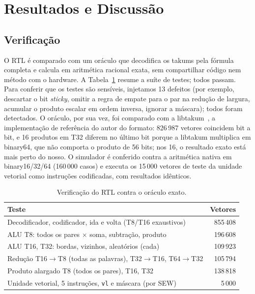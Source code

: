 \documentclass[conference]{IEEEtran}
\newcommand{\code}[1]{\texttt{#1}}
\begin{document}
\section{Resultados e Discussão}

\subsection{Verificação}

O RTL é comparado com um oráculo que decodifica os takums pela fórmula completa e calcula em aritmética
racional exata, sem compartilhar código nem método com o hardware. A Tabela~\ref{tab:verif} resume a suíte
de testes; todos passam. Para conferir que os testes são sensíveis, injetamos 13 defeitos (por exemplo,
descartar o bit \emph{sticky}, omitir a regra de empate para o par na redução de largura, acumular o
produto escalar em ordem inversa, ignorar a máscara); todos foram detectados. O oráculo, por sua vez, foi comparado com a libtakum~\cite{libtakum}, a
implementação de referência do autor do formato: 826\,987 vetores coincidem bit a bit, e 16 produtos em T32
diferem no último bit porque a libtakum multiplica em binary64, que não comporta o produto de 56 bits; nos
16, o resultado exato está mais perto do nosso. O simulador é conferido
contra a aritmética nativa em binary16/32/64 (160\,000 casos) e executa os 15\,000 vetores de teste da
unidade vetorial como instruções codificadas, com resultados idênticos.

\begin{table}[t]
\caption{Verificação do RTL contra o oráculo exato.}
\label{tab:verif}
\centering
\begin{tabular}{@{}lr@{}}
\toprule
Teste & Vetores\\
\midrule
Decodificador, codificador, ida e volta (T8/T16 exaustivos) & 855\,408\\
ALU T8: todos os pares $\times$ soma, subtração, produto & 196\,608\\
ALU T16, T32: bordas, vizinhos, aleatórios (cada) & 109\,923\\
Redução T16$\to$T8 (todas as palavras), T32$\to$T16, T64$\to$T32 & 105\,794\\
Produto alargado T8 (todos os pares), T16, T32 & 138\,818\\
Unidade vetorial, 5 instruções, \code{vl} e máscara (por SEW) & 5\,000\\
\bottomrule
\end{tabular}
\end{table}
\end{document}
